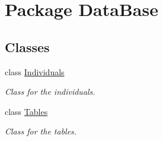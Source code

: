 \hypertarget{namespace_data_base}{
\section{Package DataBase}
\label{namespace_data_base}
}
\subsection*{Classes}
\begin{DoxyCompactItemize}
\item 
class \hyperlink{class_data_base_1_1_individuals}{Individuals}
\begin{DoxyCompactList}\small\item\em Class for the individuals. \end{DoxyCompactList}\item 
class \hyperlink{class_data_base_1_1_tables}{Tables}
\begin{DoxyCompactList}\small\item\em Class for the tables. \end{DoxyCompactList}\end{DoxyCompactItemize}

